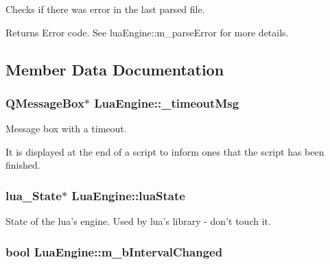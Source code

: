Checks if there was error in the last parsed file. 

\begin{DoxyReturn}{Returns}
Error code. See lua\-Engine\-::m\-\_\-parse\-Error for more details. 
\end{DoxyReturn}


\subsection{Member Data Documentation}
\hypertarget{class_lua_engine_a427a0ecc61c8b6b06bc0b4e86f32ae2d}{
\subsubsection[{\-\_\-timeout\-Msg}]{\setlength{\rightskip}{0pt plus 5cm}Q\-Message\-Box$\ast$ Lua\-Engine\-::\-\_\-timeout\-Msg\hspace{0.3cm}{\ttfamily [private]}}}\label{class_lua_engine_a427a0ecc61c8b6b06bc0b4e86f32ae2d}


Message box with a timeout. 

It is displayed at the end of a script to inform ones that the script has been finished. \hypertarget{class_lua_engine_af9593e71b3d33a62cbf9e3080771bff9}{
\subsubsection[{lua\-State}]{\setlength{\rightskip}{0pt plus 5cm}lua\-\_\-\-State$\ast$ Lua\-Engine\-::lua\-State\hspace{0.3cm}{\ttfamily [private]}}}\label{class_lua_engine_af9593e71b3d33a62cbf9e3080771bff9}


State of the lua's engine. Used by lua's library -\/ don't touch it. 

\hypertarget{class_lua_engine_add74083d158ee3543d0644c0b6349c5d}{
\subsubsection[{m\-\_\-b\-Interval\-Changed}]{\setlength{\rightskip}{0pt plus 5cm}bool Lua\-Engine\-::m\-\_\-b\-Interval\-Changed\hspace{0.3cm}{\ttfamily [private]}}}\label{class_lua_engine_add74083d158ee3543d0644c0b6349c5d}


